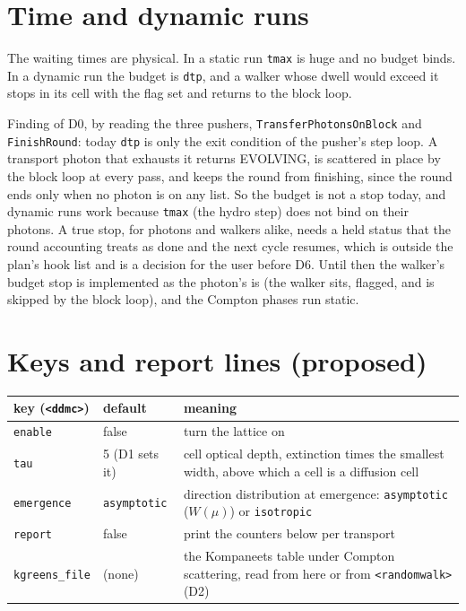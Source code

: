 \documentclass[11pt]{article}
\newcommand{\key}[1]{\texttt{#1}}
\begin{document}
\section{Time and dynamic runs}
\label{sec:time}

The waiting times are physical.  In a static run \texttt{tmax} is huge and no budget
binds.  In a dynamic run the budget is \texttt{dtp}, and a walker whose dwell would
exceed it stops in its cell with the flag set and returns to the block loop.

Finding of D0, by reading the three pushers, \texttt{TransferPhotonsOnBlock} and
\texttt{FinishRound}: today \texttt{dtp} is only the exit condition of the pusher's
step loop.  A transport photon that exhausts it returns EVOLVING, is scattered in place
by the block loop at every pass, and keeps the round from finishing, since the round
ends only when no photon is on any list.  So the budget is not a stop today, and
dynamic runs work because \texttt{tmax} (the hydro step) does not bind on their
photons.  A true stop, for photons and walkers alike, needs a held status that the
round accounting treats as done and the next cycle resumes, which is outside the
plan's hook list and is a decision for the user before D6.  Until then the walker's
budget stop is implemented as the photon's is (the walker sits, flagged, and is
skipped by the block loop), and the Compton phases run static.

\section{Keys and report lines (proposed)}
\label{sec:keys}

\begin{center}
\begin{tabular}{llp{8.2cm}}
\toprule
key (\texttt{<ddmc>}) & default & meaning \\
\midrule
\key{enable} & false & turn the lattice on \\
\key{tau} & 5 (D1 sets it) & cell optical depth, extinction times the smallest width, above which a cell is a diffusion cell \\
\key{emergence} & \texttt{asymptotic} & direction distribution at emergence: \texttt{asymptotic} ($W(\mu)$) or \texttt{isotropic} \\
\key{report} & false & print the counters below per transport \\
\key{kgreens\_file} & (none) & the Kompaneets table under Compton scattering, read from here or from \texttt{<randomwalk>} (D2) \\
\bottomrule
\end{tabular}
\end{center}
\end{document}
